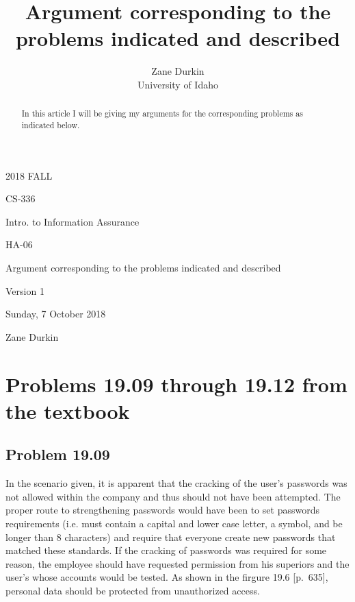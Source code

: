 \documentclass[14pt]{article}
\begin{document}
\title{Argument corresponding to the problems indicated and described}

\author{Zane Durkin\\
    University of Idaho}
\begin{description}[leftmargin=!, labelwidth=\widthof{\bfseries Author(s) Name(s)}]
\item [Year and Semester] 2018 FALL
\item [Course Number] CS-336
\item [Course Title] Intro. to Information Assurance
\item [Work Number] HA-06
\item [Work Name] Argument corresponding to the problems indicated and described
\item [Work Version] Version 1
\item [Long Date] Sunday, 7 October 2018
\item [Author(s) Name(s)] Zane Durkin
\end{description}
\begin{abstract}
In this article I will be giving my arguments for the corresponding problems as indicated below.
\end{abstract}

\section{Problems 19.09 through 19.12 from the textbook \cite{stallings}}
\subsection{Problem 19.09}
In the scenario given, it is apparent that the cracking of the user's passwords was not allowed within the company and thus should not have been attempted. The proper route to strengthening passwords would have been to set passwords requirements (i.e. must contain a capital and lower case letter, a symbol, and be longer than 8 characters) and require that everyone create new passwords that matched these standards. If the cracking of passwords was required for some reason, the employee should have requested permission from his superiors and the user's whose accounts would be tested. As shown in the firgure 19.6 \cite{stallings}[p.~635], personal data should be protected from unauthorized access.
\newpage
\end{document}
